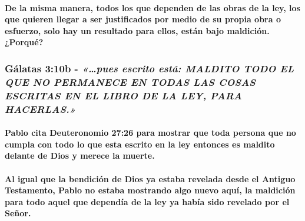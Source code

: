 \documentclass[11a pt,twoside]{article}
\newcommand{\scripture}[1]{%
  {\fontsize{12pt}{16pt}\selectfont\ScriptureFont\itshape #1}%
}
\def\textbf#1{#1}%
\let\oldsubsubsection\subsubsection
\renewcommand{\subsubsection}{\needspace{4\baselineskip}\oldsubsubsection}
\let\oldparagraph\paragraph
\renewcommand{\paragraph}{\needspace{3\baselineskip}\oldparagraph}
\begin{document}
\paragraph{\texorpdfstring{De la misma manera, \textbf{todos} los que
dependen de las obras de la ley, los que quieren llegar a ser
justificados por medio de su propia obra o esfuerzo, solo hay un
resultado para ellos, están bajo maldición.
¿Porqué?}{De la misma manera, todos los que dependen de las obras de la ley, los que quieren llegar a ser justificados por medio de su propia obra o esfuerzo, solo hay un resultado para ellos, están bajo maldición. ¿Porqué?}}\label{de-la-misma-manera-todos-los-que-dependen-de-las-obras-de-la-ley-los-que-quieren-llegar-a-ser-justificados-por-medio-de-su-propia-obra-o-esfuerzo-solo-hay-un-resultado-para-ellos-estuxe1n-bajo-maldiciuxf3n.-porquuxe9}

\subsubsection{\texorpdfstring{Gálatas 3:10b -
\scripture{«…pues escrito está: MALDITO TODO EL QUE NO PERMANECE EN TODAS LAS COSAS ESCRITAS EN EL LIBRO DE LA LEY, PARA HACERLAS.»}}{Gálatas 3:10b - }}\label{guxe1latas-310b---pues-escrito-estuxe1-maldito-todo-el-que-no-permanece-en-todas-las-cosas-escritas-en-el-libro-de-la-ley-para-hacerlas.}

\paragraph{Pablo cita Deuteronomio 27:26 para mostrar que toda persona
que no cumpla con todo lo que esta escrito en la ley entonces es maldito
delante de Dios y merece la
muerte.}\label{pablo-cita-deuteronomio-2726-para-mostrar-que-toda-persona-que-no-cumpla-con-todo-lo-que-esta-escrito-en-la-ley-entonces-es-maldito-delante-de-dios-y-merece-la-muerte.}

\paragraph{Al igual que la bendición de Dios ya estaba revelada desde el
Antiguo Testamento, Pablo no estaba mostrando algo nuevo aquí, la
maldición para todo aquel que dependía de la ley ya había sido revelado
por el
Señor.}\label{al-igual-que-la-bendiciuxf3n-de-dios-ya-estaba-revelada-desde-el-antiguo-testamento-pablo-no-estaba-mostrando-algo-nuevo-aquuxed-la-maldiciuxf3n-para-todo-aquel-que-dependuxeda-de-la-ley-ya-habuxeda-sido-revelado-por-el-seuxf1or.}
\end{document}
